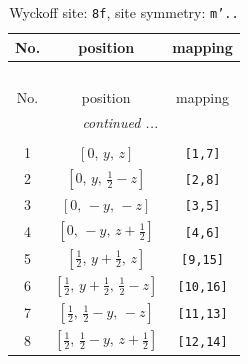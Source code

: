 \documentclass[fleqn,8pt]{jsarticle}
\begin{document}
\begin{longtable}{ccc}
\caption{Wyckoff site: {\tt 8f}, site symmetry: {\tt m'..}}
 \\
 \hline \hline
No. & position & mapping \\ \hline \endfirsthead

\multicolumn{2}{l}{\tablename\ \thetable{}} \\
 \hline \hline
No. & position & mapping \\ \hline \endhead

 \hline \hline
\multicolumn{2}{r}{\footnotesize\it continued ...} \\ \endfoot

 \hline \hline
\multicolumn{2}{r}{} \\ \endlastfoot

1 & $\left[ 0,\, y,\, z \right]$ & {\tt [1,7]} \\ \hline
2 & $\left[ 0,\, y,\, \frac{1}{2} - z \right]$ & {\tt [2,8]} \\ \hline
3 & $\left[ 0,\, - y,\, - z \right]$ & {\tt [3,5]} \\ \hline
4 & $\left[ 0,\, - y,\, z + \frac{1}{2} \right]$ & {\tt [4,6]} \\ \hline
5 & $\left[ \frac{1}{2},\, y + \frac{1}{2},\, z \right]$ & {\tt [9,15]} \\ \hline
6 & $\left[ \frac{1}{2},\, y + \frac{1}{2},\, \frac{1}{2} - z \right]$ & {\tt [10,16]} \\ \hline
7 & $\left[ \frac{1}{2},\, \frac{1}{2} - y,\, - z \right]$ & {\tt [11,13]} \\ \hline
8 & $\left[ \frac{1}{2},\, \frac{1}{2} - y,\, z + \frac{1}{2} \right]$ & {\tt [12,14]} \\
\end{longtable}
\renewcommand{\arraystretch}{1.2}
\end{document}

